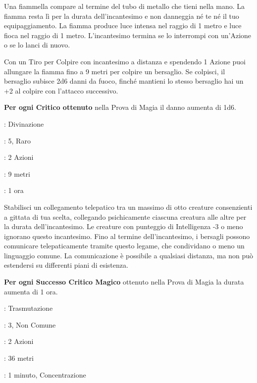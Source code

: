 \begin{multicols}{2}
Una fiammella compare al termine del tubo di metallo che tieni nella mano. La fiamma resta lì per la durata dell'incantesimo e non danneggia né te né il tuo equipaggiamento. La fiamma produce luce intensa nel raggio di 1 metro e luce fioca nel raggio di 1 metro. L'incantesimo termina se lo interrompi con un'Azione o se lo lanci di nuovo.

Con un Tiro per Colpire con incantesimo a distanza e spendendo 1 Azione puoi allungare la fiamma fino a 9 metri per colpire un bersaglio. Se colpisci, il bersaglio subisce 2d6 danni da fuoco, finché mantieni lo stesso bersaglio hai un +2 al colpire con l'attacco successivo.

\textbf{Per ogni Critico ottenuto} nella Prova di Magia il danno aumenta di 1d6.

\noindent\colorbox{OBSSgold!10}{
\begin{minipage}{0.95\linewidth}
\begin{description}[noitemsep, topsep=0pt, parsep=0pt, partopsep=0pt, leftmargin=0cm, labelwidth=1.3cm]
	\item[\textbf{Lista}]: Divinazione
	\item[\textbf{Livello}]: 5, Raro
	\item[\textbf{Lancio}]: 2 Azioni
	\item[\textbf{Gittata}]: 9 metri
	\item[\textbf{Durata}]: 1 ora
\end{description}
\end{minipage}}\smallskip

Stabilisci un collegamento telepatico tra un massimo di otto creature consenzienti a gittata di tua scelta, collegando psichicamente ciascuna creatura alle altre per la durata dell'incantesimo. Le creature con punteggio di Intelligenza -3 o meno ignorano questo incantesimo. Fino al termine dell'incantesimo, i bersagli possono comunicare telepaticamente tramite questo legame, che condividano o meno un linguaggio comune. La comunicazione è possibile a qualsiasi distanza, ma non può estendersi su differenti piani di esistenza.

\textbf{Per ogni Successo Critico Magico} ottenuto nella Prova di Magia la durata aumenta di 1 ora.

\hypertarget{lentezza}{}
\noindent
\begin{description}[noitemsep, topsep=0pt, parsep=0pt, partopsep=0pt, leftmargin=0cm, labelwidth=1.3cm]
	\item[\textbf{Lista}]: Trasmutazione
	\item[\textbf{Livello}]: 3, Non Comune
	\item[\textbf{Lancio}]: 2 Azioni
	\item[\textbf{Gittata}]: 36 metri
	\item[\textbf{Durata}]: 1 minuto, Concentrazione
\end{description}


\end{multicols}
